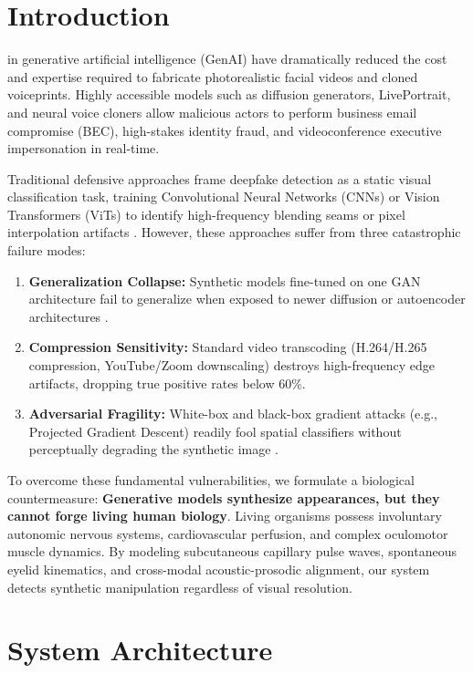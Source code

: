 \documentclass[journal,10pt,twocolumn]{IEEEtran}
\begin{document}
\section{Introduction}
 in generative artificial intelligence (GenAI) have dramatically reduced the cost and expertise required to fabricate photorealistic facial videos and cloned voiceprints. Highly accessible models such as diffusion generators, LivePortrait, and neural voice cloners allow malicious actors to perform business email compromise (BEC), high-stakes identity fraud, and videoconference executive impersonation in real-time.

Traditional defensive approaches frame deepfake detection as a static visual classification task, training Convolutional Neural Networks (CNNs) or Vision Transformers (ViTs) to identify high-frequency blending seams or pixel interpolation artifacts \cite{rossler2019faceforensics}. However, these approaches suffer from three catastrophic failure modes:
\begin{enumerate}
    \item \textbf{Generalization Collapse:} Synthetic models fine-tuned on one GAN architecture fail to generalize when exposed to newer diffusion or autoencoder architectures \cite{li2020celeb}.
    \item \textbf{Compression Sensitivity:} Standard video transcoding (H.264/H.265 compression, YouTube/Zoom downscaling) destroys high-frequency edge artifacts, dropping true positive rates below 60\%.
    \item \textbf{Adversarial Fragility:} White-box and black-box gradient attacks (e.g., Projected Gradient Descent) readily fool spatial classifiers without perceptually degrading the synthetic image \cite{madry2018towards}.
\end{enumerate}

To overcome these fundamental vulnerabilities, we formulate a biological countermeasure: \textbf{Generative models synthesize appearances, but they cannot forge living human biology}. Living organisms possess involuntary autonomic nervous systems, cardiovascular perfusion, and complex oculomotor muscle dynamics. By modeling subcutaneous capillary pulse waves, spontaneous eyelid kinematics, and cross-modal acoustic-prosodic alignment, our system detects synthetic manipulation regardless of visual resolution.

\section{System Architecture}
\end{document}
